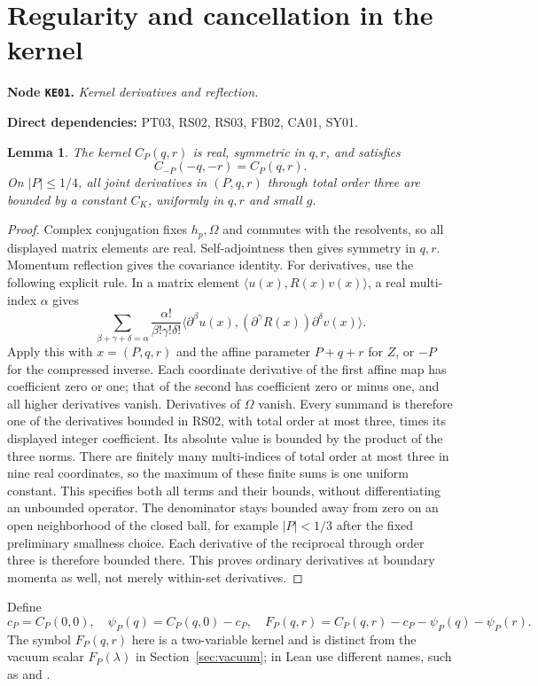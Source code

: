 \documentclass[11pt,a4paper]{article}
\newtheorem{lemma}[theorem]{Lemma}
\theoremstyle{remark}\newtheorem{remark}[theorem]{Remark}
\newcommand{\abs}[1]{\lvert #1\rvert}\newcommand{\rankone}[2]{\lvert #1\rangle\langle #2\rvert}
\newcommand{\node}[3]{\par\Needspace{6\baselineskip}\smallskip\hypertarget{node:#1}{}\label{nodepage:#1}\noindent\textbf{Node \texttt{#1}.} \textit{#2.}\par\noindent\textbf{Direct dependencies:} #3.\par}
\newcommand{\module}[1]{\texttt{\path{#1}}}
\begin{document}
\section{Regularity and cancellation in the kernel}\label{sec:kernelbounds}
\node{KE01}{Kernel derivatives and reflection}{PT03, RS02, RS03, FB02, CA01, SY01}
\begin{lemma}\label{lem:Cregularity}
The kernel $C_P(q,r)$ is real, symmetric in $q,r$, and satisfies
\[
 C_{-P}(-q,-r)=C_P(q,r).
\]
On $\abs P\leq1/4$, all joint derivatives in $(P,q,r)$ through total order three are bounded by a constant $C_K$, uniformly in $q,r$ and small $g$.
\end{lemma}
\begin{proof}
Complex conjugation fixes $h_p,\Omega$ and commutes with the resolvents, so all displayed matrix elements are real. Self-adjointness then gives symmetry in $q,r$. Momentum reflection gives the covariance identity. For derivatives, use the following explicit rule. In a matrix element $\langle u(x),R(x)v(x)\rangle$, a real multi-index $\alpha$ gives
\[
 \sum_{\beta+\gamma+\delta=\alpha}
 \frac{\alpha!}{\beta!\gamma!\delta!}
 \langle\partial^\beta u(x),(\partial^\gamma R(x))\partial^\delta v(x)\rangle.
\]
Apply this with $x=(P,q,r)$ and the affine parameter $P+q+r$ for $Z$, or $-P$ for the compressed inverse. Each coordinate derivative of the first affine map has coefficient zero or one; that of the second has coefficient zero or minus one, and all higher derivatives vanish. Derivatives of $\Omega$ vanish. Every summand is therefore one of the derivatives bounded in RS02, with total order at most three, times its displayed integer coefficient. Its absolute value is bounded by the product of the three norms. There are finitely many multi-indices of total order at most three in nine real coordinates, so the maximum of these finite sums is one uniform constant. This specifies both all terms and their bounds, without differentiating an unbounded operator. The denominator stays bounded away from zero on an open neighborhood of the closed ball, for example $\abs P<1/3$ after the fixed preliminary smallness choice. Each derivative of the reciprocal through order three is therefore bounded there. This proves ordinary derivatives at boundary momenta as well, not merely within-set derivatives.
\end{proof}

Define
\begin{equation}
 c_P=C_P(0,0),\quad
 \psi_P(q)=C_P(q,0)-c_P,\quad
 F_P(q,r)=C_P(q,r)-c_P-\psi_P(q)-\psi_P(r).
 \label{eq:decomp}
\end{equation}
The symbol $F_P(q,r)$ here is a two-variable kernel and is distinct from the vacuum scalar $F_P(\lambda)$ in Section~\ref{sec:vacuum}; in Lean use different names, such as \module{vacuumSchurScalar} and \module{remainderKernel}.
\end{document}
